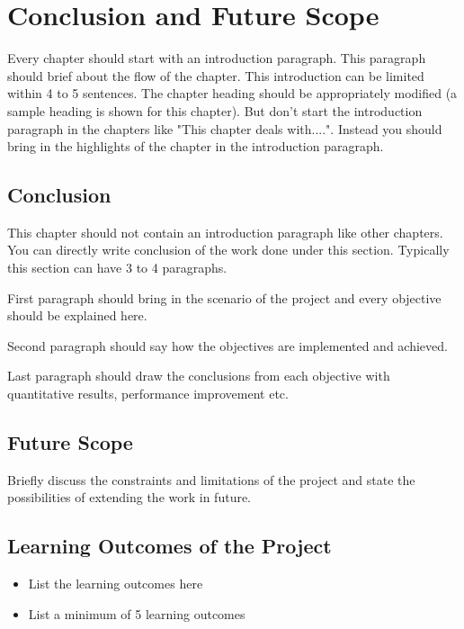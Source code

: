\chapter{Conclusion and Future Scope}
Every chapter should start with an introduction paragraph. This paragraph should brief about the flow of the chapter. This introduction can be limited within 4 to 5 sentences. The chapter heading should be appropriately modified (a sample heading is shown for this chapter). But don't start the introduction paragraph in the chapters like "This chapter deals with....". Instead you should bring in the highlights of the chapter in the introduction paragraph.

\section{Conclusion}
This chapter should not contain an introduction paragraph like other chapters. You can directly write conclusion of the work done under this section. Typically this section can have 3 to 4 paragraphs. 

First paragraph should bring in the scenario of the project and every objective should be explained here.

Second paragraph should say how the objectives are implemented and achieved.

Last paragraph should draw the conclusions from each objective with quantitative results, performance improvement etc. 

\section{Future Scope}
Briefly discuss the constraints and limitations of the project and state the possibilities of extending the work in future.
\section{Learning Outcomes of the Project}
\begin{itemize}
\item List the learning outcomes here
\item List a minimum of 5 learning outcomes
\end{itemize}

